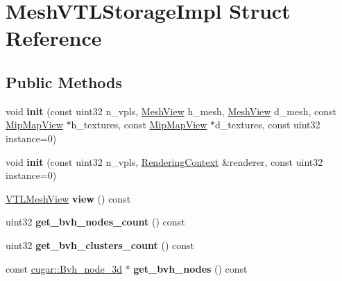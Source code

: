 \hypertarget{struct_mesh_v_t_l_storage_impl}{}\section{Mesh\+V\+T\+L\+Storage\+Impl Struct Reference}
\label{struct_mesh_v_t_l_storage_impl}
\subsection*{Public Methods}
\begin{DoxyCompactItemize}
\item 
\mbox{\label{struct_mesh_v_t_l_storage_impl_ab8974dddf2edc083626431055da92e84}} 
void {\bfseries init} (const uint32 n\+\_\+vpls, \hyperlink{struct_mesh_view}{Mesh\+View} h\+\_\+mesh, \hyperlink{struct_mesh_view}{Mesh\+View} d\+\_\+mesh, const \hyperlink{struct_mip_map_view}{Mip\+Map\+View} $\ast$h\+\_\+textures, const \hyperlink{struct_mip_map_view}{Mip\+Map\+View} $\ast$d\+\_\+textures, const uint32 instance=0)
\item 
\mbox{\label{struct_mesh_v_t_l_storage_impl_a4bebac4f884b643c7d03c7b01eadf840}} 
void {\bfseries init} (const uint32 n\+\_\+vpls, \hyperlink{struct_rendering_context}{Rendering\+Context} \&renderer, const uint32 instance=0)
\item 
\mbox{\label{struct_mesh_v_t_l_storage_impl_af214b0429e69e1e26ec324ff9cc1b9f3}} 
\hyperlink{struct_v_t_l_mesh_view}{V\+T\+L\+Mesh\+View} {\bfseries view} () const
\item 
\mbox{\label{struct_mesh_v_t_l_storage_impl_aefaf3a6a1f2f32846d667d0808e81e89}} 
uint32 {\bfseries get\+\_\+bvh\+\_\+nodes\+\_\+count} () const
\item 
\mbox{\label{struct_mesh_v_t_l_storage_impl_a8926cfbaa890115b939190c3928a1b69}} 
uint32 {\bfseries get\+\_\+bvh\+\_\+clusters\+\_\+count} () const
\item 
\mbox{\label{struct_mesh_v_t_l_storage_impl_ad263c3ca230e5ceba2fdbaa34f1011a5}} 
const \hyperlink{structcugar_1_1_bvh__node__3d}{cugar\+::\+Bvh\+\_\+node\+\_\+3d} $\ast$ {\bfseries get\+\_\+bvh\+\_\+nodes} () const

\end{DoxyCompactItemize}
